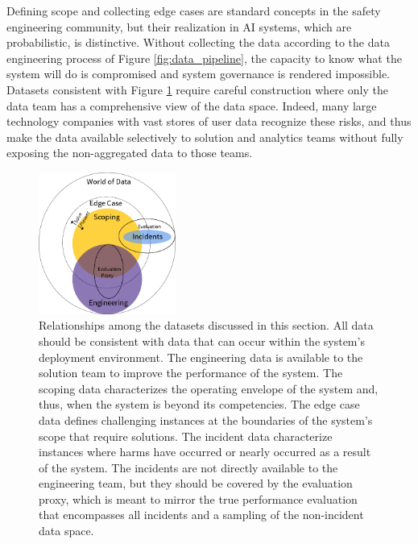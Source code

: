 Defining scope and collecting edge cases are standard concepts in the safety engineering community, but their realization in AI systems, which are probabilistic, is distinctive. Without collecting the data according to the data engineering process of Figure \ref{fig:data_pipeline}, the capacity to know what the system will do is compromised and system governance is rendered impossible. Datasets consistent with Figure \ref{fig:venn} require careful construction where only the data team has a comprehensive view of the data space. Indeed, many large technology companies with vast stores of user data recognize these risks, and thus make the data available selectively to solution and analytics teams without fully exposing the non-aggregated data to those teams.

\begin{figure}[ht]
    \centering
    \includegraphics[width=0.4\textwidth]{images/PenpotVenn2.png}
    \caption{Relationships among the datasets discussed in this section. All data should be consistent with data that can occur within the system's deployment environment. The engineering data is available to the solution team to improve the performance of the system. The scoping data characterizes the operating envelope of the system and, thus, when the system is beyond its competencies. The edge case data defines challenging instances at the boundaries of the system's scope that require solutions. The incident data characterize instances where harms have occurred or nearly occurred as a result of the system. The incidents are not directly available to the engineering team, but they should be covered by the evaluation proxy, which is meant to mirror the true performance evaluation that encompasses all incidents and a sampling of the non-incident data space. }
    \label{fig:venn}
\end{figure}

